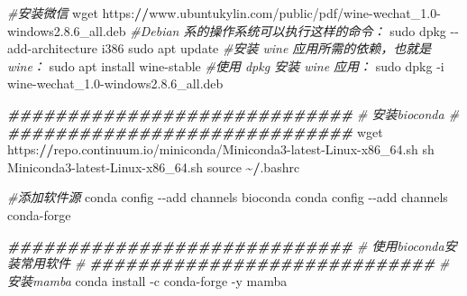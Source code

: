 \documentclass[
  10pt,
]{book}
\newenvironment{Shaded}{\begin{snugshade}}{\end{snugshade}}
\newcommand{\CommentTok}[1]{\textcolor[rgb]{0.56,0.35,0.01}{\textit{#1}}}
\newcommand{\DocumentationTok}[1]{\textcolor[rgb]{0.56,0.35,0.01}{\textbf{\textit{#1}}}}
\newcommand{\ErrorTok}[1]{\textcolor[rgb]{0.64,0.00,0.00}{\textbf{#1}}}
\newcommand{\FloatTok}[1]{\textcolor[rgb]{0.00,0.00,0.81}{#1}}
\newcommand{\NormalTok}[1]{#1}
\newcommand{\SpecialCharTok}[1]{\textcolor[rgb]{0.00,0.00,0.00}{#1}}
\begin{document}
\begin{Shaded}
\begin{Highlighting}[]
\CommentTok{\#安装微信}
\NormalTok{wget https}\SpecialCharTok{:}\ErrorTok{//}\NormalTok{www.ubuntukylin.com}\SpecialCharTok{/}\NormalTok{public}\SpecialCharTok{/}\NormalTok{pdf}\SpecialCharTok{/}\NormalTok{wine}\SpecialCharTok{{-}}\NormalTok{wechat\_1}\FloatTok{.0}\SpecialCharTok{{-}}\NormalTok{windows2.}\FloatTok{8.6}\NormalTok{\_all.deb}
\CommentTok{\#Debian 系的操作系统可以执行这样的命令：}
\NormalTok{sudo dpkg }\SpecialCharTok{{-}{-}}\NormalTok{add}\SpecialCharTok{{-}}\NormalTok{architecture i386}
\NormalTok{sudo apt update}
\CommentTok{\#安装 wine 应用所需的依赖，也就是 wine：}
\NormalTok{sudo apt install wine}\SpecialCharTok{{-}}\NormalTok{stable}
\CommentTok{\#使用 dpkg 安装 wine 应用：}
\NormalTok{sudo dpkg }\SpecialCharTok{{-}}\NormalTok{i wine}\SpecialCharTok{{-}}\NormalTok{wechat\_1}\FloatTok{.0}\SpecialCharTok{{-}}\NormalTok{windows2.}\FloatTok{8.6}\NormalTok{\_all.deb}

\DocumentationTok{\#\#\#\#\#\#\#\#\#\#\#\#\#\#\#\#\#\#\#\#\#\#\#\#\#\#\#\#\#}
\CommentTok{\#       安装bioconda         \#}
\DocumentationTok{\#\#\#\#\#\#\#\#\#\#\#\#\#\#\#\#\#\#\#\#\#\#\#\#\#\#\#\#\#}
\NormalTok{wget https}\SpecialCharTok{:}\ErrorTok{//}\NormalTok{repo.continuum.io}\SpecialCharTok{/}\NormalTok{miniconda}\SpecialCharTok{/}\NormalTok{Miniconda3}\SpecialCharTok{{-}}\NormalTok{latest}\SpecialCharTok{{-}}\NormalTok{Linux}\SpecialCharTok{{-}}\NormalTok{x86\_64.sh  }
\NormalTok{sh Miniconda3}\SpecialCharTok{{-}}\NormalTok{latest}\SpecialCharTok{{-}}\NormalTok{Linux}\SpecialCharTok{{-}}\NormalTok{x86\_64.sh  }
\NormalTok{source }\SpecialCharTok{\textasciitilde{}}\ErrorTok{/}\NormalTok{.bashrc}

\CommentTok{\#添加软件源}
\NormalTok{conda config }\SpecialCharTok{{-}{-}}\NormalTok{add channels bioconda }
\NormalTok{conda config }\SpecialCharTok{{-}{-}}\NormalTok{add channels conda}\SpecialCharTok{{-}}\NormalTok{forge}

\DocumentationTok{\#\#\#\#\#\#\#\#\#\#\#\#\#\#\#\#\#\#\#\#\#\#\#\#\#\#\#\#\#}
\CommentTok{\# 使用bioconda安装常用软件   \#}
\DocumentationTok{\#\#\#\#\#\#\#\#\#\#\#\#\#\#\#\#\#\#\#\#\#\#\#\#\#\#\#\#\#}
\CommentTok{\#安装mamba}
\NormalTok{conda install }\SpecialCharTok{{-}}\NormalTok{c conda}\SpecialCharTok{{-}}\NormalTok{forge }\SpecialCharTok{{-}}\NormalTok{y mamba}


\end{Highlighting}
\end{Shaded}
\end{document}
